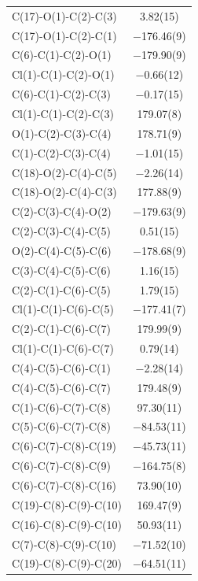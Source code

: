 \begin{center}
\tablefirsthead{%
\toprule}
\tablelasttail{\bottomrule}
{\footnotesize \singlespacing
\begin{supertabular}{p{1.5in}c}
C(17)-O(1)-C(2)-C(3)&3.82(15)\\
C(17)-O(1)-C(2)-C(1)&$-$176.46(9)\\
C(6)-C(1)-C(2)-O(1)&$-$179.90(9)\\
Cl(1)-C(1)-C(2)-O(1)&$-$0.66(12)\\
C(6)-C(1)-C(2)-C(3)&$-$0.17(15)\\
Cl(1)-C(1)-C(2)-C(3)&179.07(8)\\
O(1)-C(2)-C(3)-C(4)&178.71(9)\\
C(1)-C(2)-C(3)-C(4)&$-$1.01(15)\\
C(18)-O(2)-C(4)-C(5)&$-$2.26(14)\\
C(18)-O(2)-C(4)-C(3)&177.88(9)\\
C(2)-C(3)-C(4)-O(2)&$-$179.63(9)\\
C(2)-C(3)-C(4)-C(5)&0.51(15)\\
O(2)-C(4)-C(5)-C(6)&$-$178.68(9)\\
C(3)-C(4)-C(5)-C(6)&1.16(15)\\
C(2)-C(1)-C(6)-C(5)&1.79(15)\\
Cl(1)-C(1)-C(6)-C(5)&$-$177.41(7)\\
C(2)-C(1)-C(6)-C(7)&179.99(9)\\
Cl(1)-C(1)-C(6)-C(7)&0.79(14)\\
C(4)-C(5)-C(6)-C(1)&$-$2.28(14)\\
C(4)-C(5)-C(6)-C(7)&179.48(9)\\
C(1)-C(6)-C(7)-C(8)&97.30(11)\\
C(5)-C(6)-C(7)-C(8)&$-$84.53(11)\\
C(6)-C(7)-C(8)-C(19)&$-$45.73(11)\\
C(6)-C(7)-C(8)-C(9)&$-$164.75(8)\\
C(6)-C(7)-C(8)-C(16)&73.90(10)\\
C(19)-C(8)-C(9)-C(10)&169.47(9)\\
C(16)-C(8)-C(9)-C(10)&50.93(11)\\
C(7)-C(8)-C(9)-C(10)&$-$71.52(10)\\
C(19)-C(8)-C(9)-C(20)&$-$64.51(11)\\

\end{supertabular}}
\end{center}

